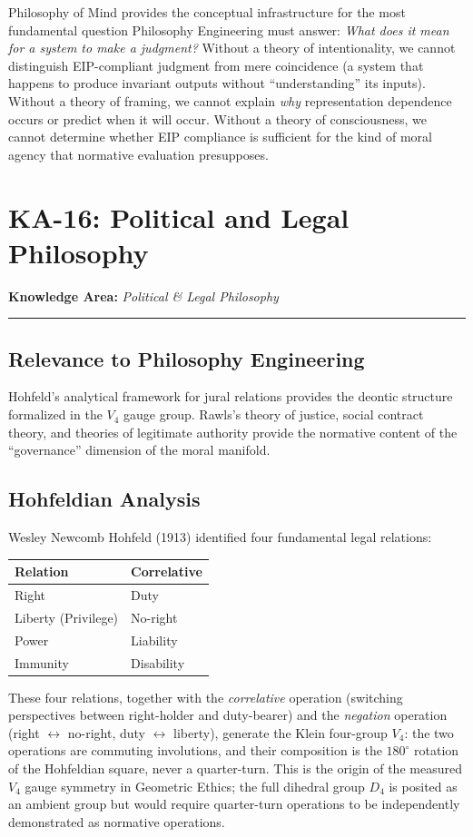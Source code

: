 \documentclass[12pt,letterpaper]{article}
\theoremstyle{definition}
\theoremstyle{plain}
\newcommand{\ka}[1]{\vspace{1em}\noindent\textbf{\large Knowledge Area:} \textit{#1}\vspace{0.5em}\hrule\vspace{0.5em}}
\begin{document}
Philosophy of Mind provides the conceptual infrastructure for the most fundamental question Philosophy Engineering must answer: \emph{What does it mean for a system to make a judgment?} Without a theory of intentionality, we cannot distinguish EIP-compliant judgment from mere coincidence (a system that happens to produce invariant outputs without ``understanding'' its inputs). Without a theory of framing, we cannot explain \emph{why} representation dependence occurs or predict when it will occur. Without a theory of consciousness, we cannot determine whether EIP compliance is sufficient for the kind of moral agency that normative evaluation presupposes.


\section{KA-16: Political and Legal Philosophy}
\label{sec:ka16}

\ka{Political \& Legal Philosophy}

\subsection{Relevance to Philosophy Engineering}

Hohfeld's analytical framework for jural relations provides the deontic structure formalized in the $V_4$ gauge group. Rawls's theory of justice, social contract theory, and theories of legitimate authority provide the normative content of the ``governance'' dimension of the moral manifold.

\subsection{Hohfeldian Analysis}

Wesley Newcomb Hohfeld (1913) identified four fundamental legal relations:
\begin{center}
\begin{tabular}{ll}
\toprule
\textbf{Relation} & \textbf{Correlative} \\
\midrule
Right & Duty \\
Liberty (Privilege) & No-right \\
Power & Liability \\
Immunity & Disability \\
\bottomrule
\end{tabular}
\end{center}

These four relations, together with the \emph{correlative} operation (switching perspectives between right-holder and duty-bearer) and the \emph{negation} operation (right $\leftrightarrow$ no-right, duty $\leftrightarrow$ liberty), generate the Klein four-group $V_4$: the two operations are commuting involutions, and their composition is the $180^\circ$ rotation of the Hohfeldian square, never a quarter-turn. This is the origin of the measured $V_4$ gauge symmetry in Geometric Ethics; the full dihedral group $D_4$ is posited as an ambient group but would require quarter-turn operations to be independently demonstrated as normative operations.
\end{document}
